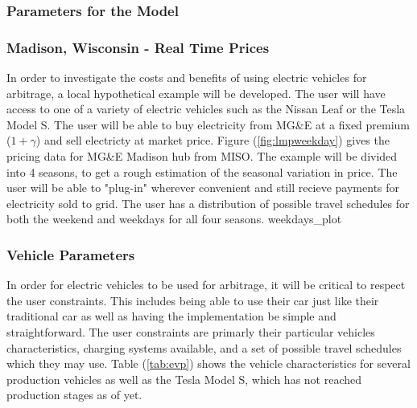 %


\subsubsection{Parameters for the Model}

\subsubsection{Madison, Wisconsin - Real Time Prices}
In order to investigate the costs and benefits of using electric vehicles for arbitrage, a local hypothetical example will be developed.  The user will have access to one of a variety of electric vehicles such as the Nissan Leaf or the Tesla Model S.  The user will be able to buy electricity from MG\&E at a fixed premium ($1+\gamma$) and sell electricty at market price.  Figure (\ref{fig:lmpweekday}) gives the pricing data for MG\&E Madison hub from MISO.  The example will be divided into 4 seasons, to get a rough estimation of the seasonal variation in price.    The user will be able to "plug-in" wherever convenient and still recieve payments for electricity sold to grid.  The user has a distribution of possible travel schedules for both the weekend and weekdays for all four seasons. 
{weekdays_plot}


\subsubsection{Vehicle Parameters}
In order for electric vehicles to be used for arbitrage, it will be critical to respect the user constraints.  This includes being able to use their car just like their traditional car as well as having the implementation be simple and straightforward.  The user constraints are primarly their particular vehicles characteristics, charging systems available, and a set of possible travel schedules which they may use.  Table (\ref{tab:evp}) shows the vehicle characteristics for several production vehicles as well as the Tesla Model S, which has not reached production stages as of yet.


